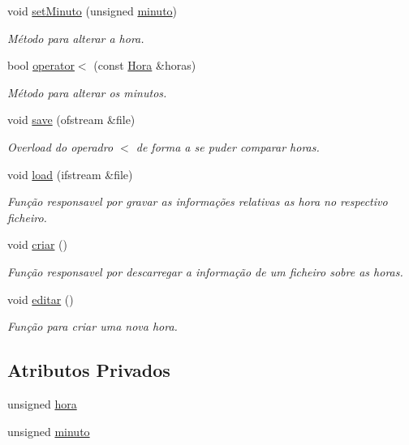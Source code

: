 \begin{DoxyCompactItemize}
void \hyperlink{class_hora_abca266485eb34d8feaf1f9e84854a7f3}{set\+Minuto} (unsigned \hyperlink{class_hora_a9d33ce2d8a3f4b3d05b2a3c6df782fa4}{minuto})
\begin{DoxyCompactList}\small\item\em Método para alterar a hora. \end{DoxyCompactList}\item 
bool \hyperlink{class_hora_a24d925d0c6d35e813542346e5d63eef9}{operator$<$} (const \hyperlink{class_hora}{Hora} \&horas)
\begin{DoxyCompactList}\small\item\em Método para alterar os minutos. \end{DoxyCompactList}\item 
void \hyperlink{class_hora_a61d7bd0b06ffbb4c446be735199c61cb}{save} (ofstream \&file)
\begin{DoxyCompactList}\small\item\em Overload do operadro $<$ de forma a se puder comparar horas. \end{DoxyCompactList}\item 
void \hyperlink{class_hora_a622aa86821d01f80e4117f27529e6879}{load} (ifstream \&file)
\begin{DoxyCompactList}\small\item\em Função responsavel por gravar as informações relativas as hora no respectivo ficheiro. \end{DoxyCompactList}\item 
void \hyperlink{class_hora_a7aa53826fa618dab6f6d1d5f2dc81451}{criar} ()
\begin{DoxyCompactList}\small\item\em Função responsavel por descarregar a informação de um ficheiro sobre as horas. \end{DoxyCompactList}\item 
void \hyperlink{class_hora_acedba833ccd61d7e60ec2c4d0ca95cda}{editar} ()
\begin{DoxyCompactList}\small\item\em Função para criar uma nova hora. \end{DoxyCompactList}\end{DoxyCompactItemize}
\subsection*{Atributos Privados}
\begin{DoxyCompactItemize}
\item 
unsigned \hyperlink{class_hora_ab901e62ae1158965687dc736a45ee8fe}{hora}
\item 
unsigned \hyperlink{class_hora_a9d33ce2d8a3f4b3d05b2a3c6df782fa4}{minuto}
\end{DoxyCompactItemize}
